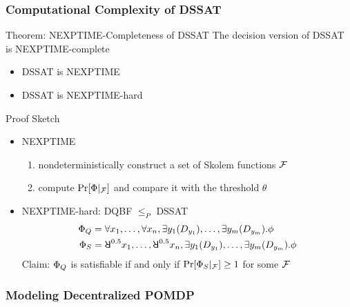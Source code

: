 \begin{frame}
    \frametitle{Computational Complexity of DSSAT}
    \begin{block}{Theorem: NEXPTIME-Completeness of DSSAT}
        The decision version of DSSAT is NEXPTIME-complete
        \begin{itemize}
            \item DSSAT is NEXPTIME
            \item DSSAT is NEXPTIME-hard
        \end{itemize}
    \end{block}
    \begin{block}{Proof Sketch}
        \begin{itemize}
            \item NEXPTIME
                  \begin{enumerate}
                      \item nondeterministically construct a set of Skolem functions $\mathcal{F}$
                      \item compute $\Pr[\Phi|_{\mathcal{F}}]$ and compare it with the threshold $\theta$
                  \end{enumerate}
            \item NEXPTIME-hard: DQBF $\leq_P$ DSSAT
                  \abovedisplayskip=0pt
                  \begin{align*}
                      \Qf_Q & = \forall x_1, \ldots, \forall x_n, \exists y_1(D_{y_1}), \ldots, \exists y_m(D_{y_m}).\pf           \\
                      \Qf_S & = \random{0.5} x_1, \ldots, \random{0.5} x_n, \exists y_1(D_{y_1}), \ldots, \exists y_m(D_{y_m}).\pf
                  \end{align*}
                  Claim: $\Phi_Q$ is satisfiable if and only if $\Pr[\Phi_S|_{\mathcal{F}}] \geq 1$ for some $\mathcal{F}$
        \end{itemize}
    \end{block}
\end{frame}

\begin{frame}
    \frametitle{Modeling Decentralized POMDP}
    \begin{center}
        
    \end{center}
\end{frame}